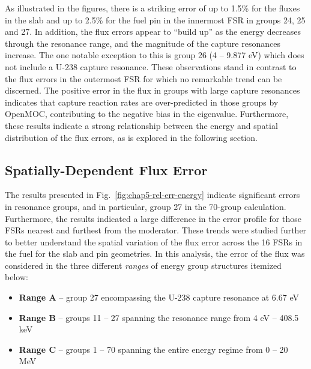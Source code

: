 As illustrated in the figures, there is a striking error of up to 1.5\% for the fluxes in the slab and up to 2.5\% for the fuel pin in the innermost \ac{FSR} in groups 24, 25 and 27. In addition, the flux errors appear to ``build up'' as the energy decreases through the resonance range, and the magnitude of the capture resonances increase. The one notable exception to this is group 26 (4 -- 9.877 eV) which does not include a U-238 capture resonance. These observations stand in contrast to the flux errors in the outermost \ac{FSR} for which no remarkable trend can be discerned. The positive error in the flux in groups with large capture resonances indicates that capture reaction rates are over-predicted in those groups by OpenMOC, contributing to the negative bias in the eigenvalue. Furthermore, these results indicate a strong relationship between the energy and spatial distribution of the flux errors, as is explored in the following section.


\subsection{Spatially-Dependent Flux Error}
\label{subsec:chap5-diagnosis-space}

The results presented in Fig.~\ref{fig:chap5-rel-err-energy} indicate significant errors in resonance groups, and in particular, group 27 in the 70-group calculation. Furthermore, the results indicated a large difference in the error profile for those \ac{FSR}s nearest and furthest from the moderator. These trends were studied further to better understand the spatial variation of the flux error across the 16 \ac{FSR}s in the fuel for the slab and pin geometries. In this analysis, the error of the flux was considered in the three different \textit{ranges} of energy group structures itemized below:

\vspace{-0.15cm}
\begin{itemize}[noitemsep]
  \item {\bf Range A} -- group 27 encompassing the U-238 capture resonance at 6.67 eV
  \item {\bf Range B} -- groups 11 -- 27 spanning the resonance range from 4 eV -- 408.5 keV
  \item {\bf Range C} -- groups 1 -- 70 spanning the entire energy regime from 0 -- 20 MeV
\end{itemize}
\vspace{-0.15cm}

